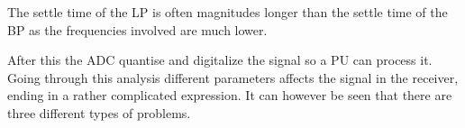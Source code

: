 The settle time of the LP is often magnitudes longer than the settle time of the BP as the frequencies involved are much lower. 

After this the \gls{ADC} quantise and digitalize the signal so a \gls{PU} can process it. Going through this analysis different parameters affects the signal in the receiver, ending in a rather complicated expression. It can however be seen that there are three different types of problems. 


